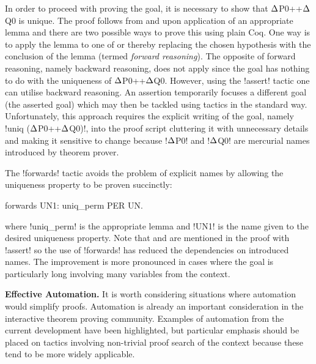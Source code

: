 In order to proceed with proving the goal, it is necessary to show that
$\Delta$P0++$\Delta$Q0 is unique. The proof follows from  and  upon
application of an appropriate lemma and there are two possible ways to prove
this using plain Coq. One way is to apply the lemma to one of  or
 thereby replacing the chosen hypothesis with the conclusion of the
lemma (termed \textit{forward reasoning}). The opposite of forward reasoning,
namely backward reasoning, does not apply since the goal has nothing to do
with the uniqueness of $\Delta$P0++$\Delta$Q0. However, using the \coqe!assert!
tactic one can utilise backward reasoning. An assertion temporarily focuses a
different goal (the asserted goal) which may then be tackled using tactics in
the standard way. Unfortunately, this approach requires the explicit writing
of the goal, namely \coqe!uniq ($\Delta$P0++$\Delta$Q0)!, into the proof script
cluttering it with unnecessary details and making it sensitive to change
because \coqe!$\Delta$P0! and \coqe!$\Delta$Q0! are mercurial names introduced by
theorem prover.

The \coqe!forwards! tactic avoids the problem of explicit names by allowing
the uniqueness property to be proven succinctly:
\begin{coq}
forwards UN1: uniq_perm PER UN.
\end{coq}

where \coqe!uniq_perm! is the appropriate lemma and \coqe!UN1! is the name
given to the desired uniqueness property. Note that  and  are
mentioned in the proof with \coqe!assert! so the use of \coqe!forwards! has
reduced the dependencies on introduced names. The improvement is more
pronounced in cases where the goal is particularly long involving many
variables from the context.

\textbf{Effective Automation.} It is worth considering situations where
automation would simplify proofs. Automation is already an important
consideration in the interactive theorem proving community. Examples of
automation from the current development have been highlighted, but particular
emphasis should be placed on tactics involving non-trivial proof search of the
context because these tend to be more widely applicable.
